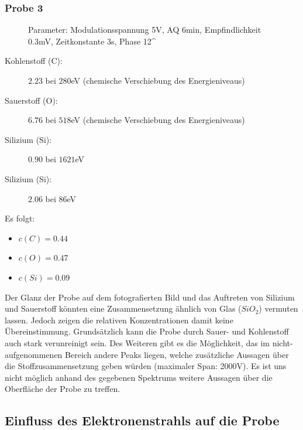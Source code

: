 
	\subsubsection{Probe 3} %
	\label{ssub:probe_3}
	
		\begin{figure}[H]
			\center
			
			\caption{\centering Parameter: Modulationsspannung 5V, AQ 6min, Empfindlichkeit 0.3mV, Zeitkonstante 3s, Phase 12^\circ}
		\end{figure}

		\begin{description}
			\item[Kohlenstoff (C):] $2.23$ bei $280$eV (chemische Verschiebung des Energieniveaus)
			\item[Sauerstoff (O):] $6.76$ bei $518$eV (chemische Verschiebung des Energieniveaus)
			\item[Silizium (Si):] $0.90$ bei $1621$eV
			\item[Silizium (Si):] $2.06$ bei $86$eV
		\end{description}

		Es folgt:

		\begin{itemize}
			\item 
				$c(C) = 0.44$
			\item
				$c(O) = 0.47$
			\item
				$c(Si) = 0.09$
		\end{itemize}

		Der Glanz der Probe auf dem fotografierten Bild und das Auftreten von Silizium und Sauerstoff könnten eine Zusammensetzung ähnlich von Glas ($SiO_2$) vermuten lassen.
		Jedoch zeigen die relativen Konzentrationen damit keine Übereinstimmung.
		Grundsätzlich kann die Probe durch Sauer- und Kohlenstoff auch stark verunreinigt sein. 
		Des Weiteren gibt es die Möglichkeit, das im nicht-aufgenommenen Bereich andere Peaks liegen, welche zusätzliche Aussagen über die Stoffzusammensetzung geben würden (maximaler Span: 2000V).
		Es ist uns nicht möglich anhand des gegebenen Spektrums weitere Aussagen über die Oberfläche der Probe zu treffen.



\subsection{Einfluss des Elektronenstrahls auf die Probe} %
\label{sub:einfluss_des_elektronenstrahls_auf_die_probe}

